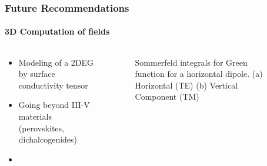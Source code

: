 \documentclass[mathserif,18pt,xcolor=table]{beamer}
\begin{document}
\begin{frame}
\frametitle{Future Recommendations}
\framesubtitle{3D Computation of fields}
\begin{columns}[T] %
  \begin{column}{.5\textwidth}
    \begin{itemize}
      \item Modeling of a 2DEG by surface conductivity tensor
      \item Going beyond III-V materials (perovskites, dichalcogenides)
      \item
    \end{itemize}
  \end{column}
  \begin{column}[T]{.5\textwidth}
    \begin{figure}
      \vspace*{-2cm}
      \subfloat{
      \label{fig:eps_Ga}}
      \vspace*{0cm}
      \subfloat{
      \label{fig:eps_Sto}}
      \caption{Sommerfeld integrals for Green function for a horizontal dipole. (a) Horizontal (TE) (b) Vertical Component (TM)}
    \end{figure}
    \end{column}%
\end{columns}
\end{frame}
\end{document}
